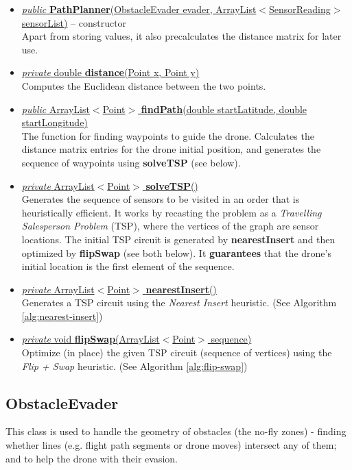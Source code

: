 \documentclass{article}
\newcommand{\alp}{ArrayList$<$Point$>$}
\newcommand{\method}[4]{\underline{\textit{#1} #2 \textbf{#3}(#4)}}
\begin{document}
\begin{itemize}
\item \underline{\textit{public} \textbf{PathPlanner}(ObstacleEvader evader, ArrayList$<$SensorReading$>$ sensorList)} -- constructor \\
  Apart from storing values, it also precalculates the distance matrix for later use.
\item \method{private}{double}{distance}{Point x, Point y} \\
  Computes the Euclidean distance between the two points.
\item \method{public}{\alp}{findPath}{double startLatitude, double startLongitude} \\
  The function for finding waypoints to guide the drone. Calculates the distance matrix entries for the drone initial position, and generates the sequence of waypoints using \textbf{solveTSP} (see below).
\item \method{private}{\alp}{solveTSP}{} \\
  Generates the sequence of sensors to be visited in an order that is heuristically efficient. It works by recasting the problem as a \textit{Travelling Salesperson Problem} (TSP), where the vertices of the graph are sensor locations. The initial TSP circuit is generated by \textbf{nearestInsert} and then optimized by \textbf{flipSwap} (see both below).
  It \textbf{guarantees} that the drone's initial location is the first element of the 
sequence.

\item \method{private}{\alp}{nearestInsert}{} \\
  Generates a TSP circuit using the \textit{Nearest Insert} heuristic. (See Algorithm \ref{alg:nearest-insert})

\item \method{private}{void}{flipSwap}{\alp \,\,sequence} \\
  Optimize (in place) the given TSP circuit (sequence of vertices) using the \textit{Flip + Swap} heuristic. (See Algorithm \ref{alg:flip-swap})
\end{itemize}


\subsection{ObstacleEvader}
\label{cls:ObstacleEvader}

This class is used to handle the geometry of obstacles (the no-fly zones) - finding whether lines (e.g. flight path segments or drone moves) intersect any of them; and to help the drone with their evasion.
\end{document}
